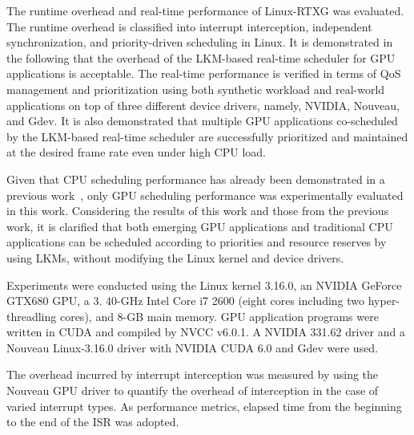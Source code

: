 \label{sec:evaluation}
The runtime overhead and real-time performance of Linux-RTXG was evaluated.
The runtime overhead is classified into interrupt interception, independent synchronization, and priority-driven scheduling in Linux.
It is demonstrated in the following that the overhead of the LKM-based real-time scheduler for GPU applications is acceptable.
The real-time performance is verified in terms of QoS management and prioritization using both synthetic workload and real-world applications on top of three different device drivers, namely, NVIDIA, Nouveau, and Gdev.
It is also demonstrated that multiple GPU applications co-scheduled by the LKM-based real-time scheduler are successfully prioritized and maintained at the desired frame rate even under high CPU load.

Given that CPU scheduling performance has already been demonstrated in a previous work~\cite{kato2009loadable}, only GPU scheduling performance was experimentally evaluated in this work.
Considering the results of this work and those from the previous work, it is clarified that both emerging GPU applications and traditional CPU applications can be scheduled according to priorities and resource reserves by using LKMs, without modifying the Linux kernel and device drivers.

Experiments were conducted using the Linux kernel 3.16.0, an NVIDIA GeForce GTX680 GPU, a 3.
40-GHz Intel Core i7 2600 (eight cores including two hyper-threadling cores), and 8-GB main memory.
GPU application programs were written in CUDA and compiled by NVCC v6.0.1. A NVIDIA 331.62 driver and a Nouveau Linux-3.16.0 driver with NVIDIA CUDA 6.0 and Gdev were used.

The overhead incurred by interrupt interception was measured by using the Nouveau GPU driver to quantify the overhead of interception in the case of varied interrupt types.
As performance metrics, elapsed time from the beginning to the end of the ISR was adopted.


